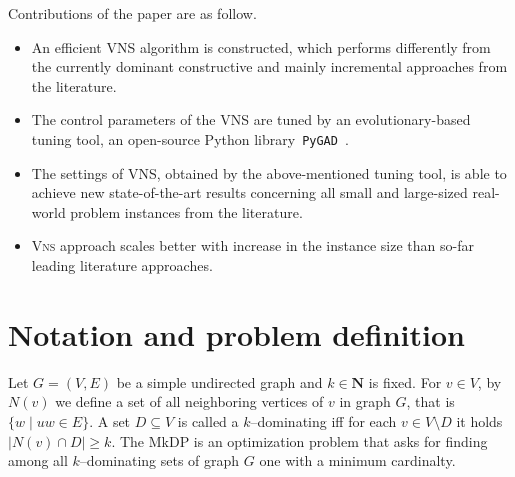\documentclass[dvipsnames,format=sigconf,anonymous=true,review=true]{acmart}
\begin{document}
Contributions of the paper are as follow.
\begin{itemize}
	\item An efficient VNS algorithm is constructed, which performs differently from  the currently dominant constructive and mainly incremental approaches from the literature.
	
	\item The control parameters of the VNS are tuned by %
	an evolutionary-based tuning tool, an open-source Python library~\texttt{PyGAD}~\cite{gad2021pygad}.  
	\item The settings of VNS, obtained by the above-mentioned tuning tool, is able to achieve new state-of-the-art results concerning all small and large-sized real-world problem instances from the literature. %
	\item  \textsc{Vns} approach scales better with increase in the instance size than so-far leading literature approaches. 
\end{itemize}

\section{Notation and problem definition }
    

    Let $G=(V,E)$ be a simple undirected graph and $k \in \mathbf{N}$ is fixed. For $v\in V$, by $N(v)$ we define a set of all neighboring vertices of $v$ in graph  $G$, that is $\{w \mid uw \in E\}$. A set $D \subseteq V$ is called a $k$--dominating iff for each $v\in V \setminus D$ it holds $|N(v) \cap D| \geq k$.  The MkDP is an optimization problem that asks for finding among all $k$--dominating sets of graph $G$ one with a minimum cardinalty. 
    
\end{document}
